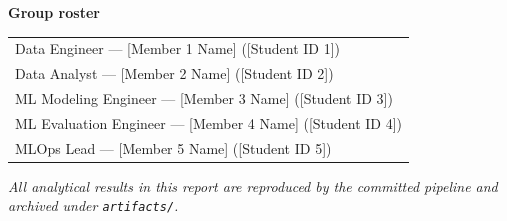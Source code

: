 \begin{titlepage}
\vfill

\begin{minipage}{0.92\linewidth}
\centering
{\normalsize\bfseries Group roster\par}
\vspace{0.45cm}
\renewcommand{\arraystretch}{1.45}
\begin{tabular}{@{}l@{}}
Data Engineer --- [Member 1 Name] ([Student ID 1]) \\
Data Analyst --- [Member 2 Name] ([Student ID 2]) \\
ML Modeling Engineer --- [Member 3 Name] ([Student ID 3]) \\
ML Evaluation Engineer --- [Member 4 Name] ([Student ID 4]) \\
MLOps Lead --- [Member 5 Name] ([Student ID 5]) \\
\end{tabular}
\end{minipage}

\vspace{1.4cm}
{\small\itshape All analytical results in this report are reproduced by the committed
pipeline and archived under \texttt{artifacts/}.\par}

\end{titlepage}
